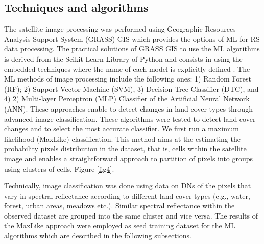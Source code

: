 \documentclass[jimaging,article,submit,pdftex,moreauthors]{Definitions/mdpi}
\begin{document}
\subsection{Techniques and algorithms}

The satellite image processing was performed using Geographic Resources Analysis Support System (GRASS) GIS which provides the options of ML for RS data processing. The practical solutions of GRASS GIS to use the ML algorithms is derived from the Scikit-Learn Library of Python \cite{scikitlearn} and consists in using the embedded techniques where the name of each model is explicitly defined \cite{rs17050822,LEMENKOVA2025100180,geosciences15030104}. The ML methods of image processing include the following ones: 1) Random Forest (RF); 2) Support Vector Machine (SVM), 3) Decision Tree Classifier (DTC), and 4) 2) Multi-layer Perceptron (MLP) Classifier of the Artificial Neural Network (ANN). {These} approaches enable to detect changes in land cover types {through advanced image classification}. These algorithms were tested to detect land cover changes {and to select the most accurate classifier}. {We first run a maximum likelihood (MaxLike) classification. This method aims at the estimating the probability pixels distribution in the dataset, that is, cells within the satellite image and enables a straightforward approach to partition of pixels into groups using clusters of cells}, Figure \ref{fig4}. 

Technically, image classification was done using data on DNs of the pixels that {vary in spectral reflectance} according to different land cover types (e.g., water, forest, urban areas, meadows etc{.)}. Similar spectral reflectance within the observed dataset are grouped into the same cluster and vice versa. The results of the MaxLike approach were employed as seed training dataset for the ML algorithms which are described in the following subsections{. }
\end{document}
